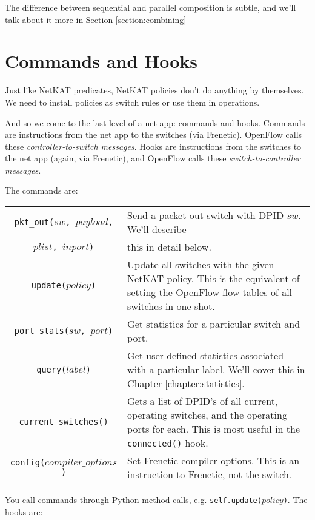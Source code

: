 The difference between sequential and parallel composition is subtle, and we'll talk about it more in
Section \ref{section:combining}

\section{Commands and Hooks}

Just like NetKAT predicates, NetKAT policies don't do anything by themselves.
We need to install policies as switch rules or use them in  operations.  

And so we come to the last level of a net app: commands and hooks.
Commands are instructions from the net app to the switches (via Frenetic).  
OpenFlow calls these \emph{controller-to-switch messages}.  
Hooks are instructions from the switches to the net app (again, via Frenetic), and OpenFlow
calls these \emph{switch-to-controller messages.}

The commands are:

\bigskip
\begin{tabularx}{\linewidth}{|c|X|}
\hline\hline
\texttt{pkt\_out($sw$, $payload$,} & Send a packet out switch with DPID $sw$.  We'll describe 
\\
\texttt{$plist$, $inport$)} & this in detail below.
\\ \hline  
\texttt{update($policy$)} & 
Update all switches with the given NetKAT policy.
This is the equivalent of setting the OpenFlow flow tables of all switches in one shot.  
\\ \hline  
\texttt{port\_stats($sw$, $port$)} & Get statistics for a particular switch and port. 
\\ \hline  
\texttt{query($label$)} & Get user-defined statistics associated with a particular label. 
We'll cover this in Chapter \ref{chapter:statistics}.
\\ \hline  
\texttt{current\_switches()} & Gets a list of DPID's of all current, operating switches, and the operating
ports for each.  
This is most useful in the \texttt{connected()} hook.  
\\ \hline  
\texttt{config($compiler\_options$)} & Set Frenetic compiler options.  
This is an instruction to Frenetic, not the switch. 
\\ \hline\hline
\end{tabularx}

\bigskip
You call commands through Python method calls, e.g. \texttt{self.update($policy$)}.  
The hooks are:

